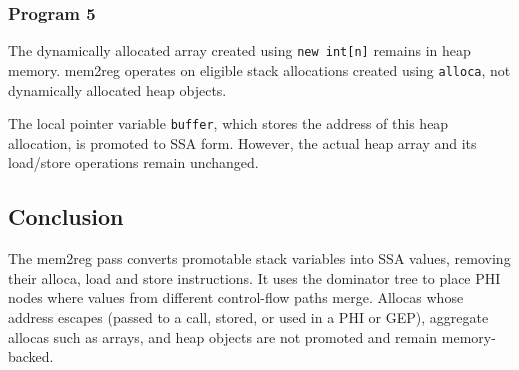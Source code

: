 \documentclass{article}
\begin{document}
\subsubsection{Program 5}

The dynamically allocated array created using \texttt{new int[n]}
remains in heap memory. mem2reg operates on eligible stack allocations
created using \texttt{alloca}, not dynamically allocated heap objects.

The local pointer variable \texttt{buffer}, which stores the address of
this heap allocation, is promoted to SSA form. However, the actual heap
array and its load/store operations remain unchanged.

\subsection{Conclusion}

The mem2reg pass converts promotable stack variables into SSA values,
removing their alloca, load and store instructions. It uses the dominator
tree to place PHI nodes where values from different control-flow paths
merge. Allocas whose address escapes (passed to a call, stored, or used
in a PHI or GEP), aggregate allocas such as arrays, and heap objects are
not promoted and remain memory-backed.
\end{document}
